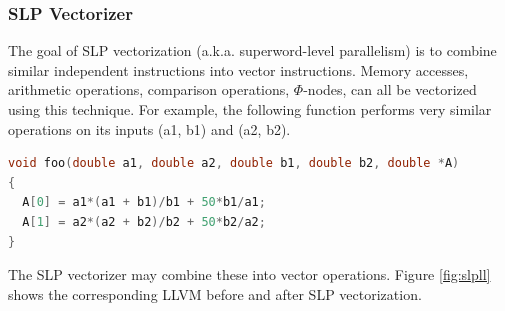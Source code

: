 \documentclass[a4paper,bibliography=totocnumbered,parskip,headsepline]{scrbook}
\begin{document}
\subsubsection{SLP Vectorizer}
The goal of SLP vectorization (a.k.a. superword-level parallelism) is to combine similar independent instructions into vector instructions.
Memory accesses, arithmetic operations, comparison operations, $\Phi$-nodes, can all be vectorized using this technique.
For example, the following function performs very similar operations on its inputs (a1, b1) and (a2, b2).

\begin{minipage}{\textwidth}
\begin{lstlisting}[language=C]
void foo(double a1, double a2, double b1, double b2, double *A)
{
  A[0] = a1*(a1 + b1)/b1 + 50*b1/a1;
  A[1] = a2*(a2 + b2)/b2 + 50*b2/a2;
}
\end{lstlisting}
\end{minipage}

The SLP vectorizer may combine these into vector operations.
Figure \ref{fig:slpll} shows the corresponding LLVM before and after SLP vectorization.
\end{document}
